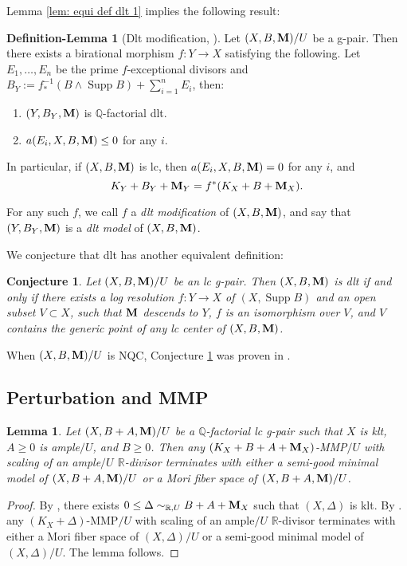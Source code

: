 \documentclass[11pt]{amsart}
\numberwithin{equation}{section}
\newcommand{\Mm}{{\bf{M}}}
\newcommand{\Qq}{\mathbb{Q}}
\newcommand{\Rr}{\mathbb{R}}
\newcommand{\Supp}{\operatorname{Supp}}
\newtheorem{conj}[thm]{Conjecture}
\newtheorem{lem}[thm]{Lemma}
\theoremstyle{definition}
\theoremstyle{definition}
\newtheorem{deflem}[thm]{Definition-Lemma}
\theoremstyle{definition}
\begin{document}
Lemma \ref{lem: equi def dlt 1} implies the following result:

\begin{deflem}[Dlt modification, {\cite[Theorem 2.9]{FS23}}]\label{deflem: dlt model}
    Let $(X,B,\Mm)/U$ be a g-pair. Then there exists a birational morphism $f: Y\rightarrow X$ satisfying the following. Let $E_1,\dots,E_n$ be the prime $f$-exceptional divisors and $B_Y:=f^{-1}_*(B\wedge\Supp B)+\sum_{i=1}^nE_i$, then:
    \begin{enumerate}
        \item $(Y,B_Y,\Mm)$ is $\Qq$-factorial dlt.
        \item $a(E_i,X,B,\Mm)\leq 0$ for any $i$.
    \end{enumerate}
    In particular, if $(X,B,\Mm)$ is lc, then $a(E_i,X,B,\Mm)=0$ for any $i$, and $$K_Y+B_Y+\Mm_Y=f^*(K_X+B+\Mm_X).$$
    
    For any such $f$, we call $f$ a \emph{dlt modification} of $(X,B,\Mm)$, and say that $(Y,B_Y,\Mm)$ is a \emph{dlt model} of $(X,B,\Mm)$. 
\end{deflem}

We conjecture that dlt has another equivalent definition:

\begin{conj}\label{conj: dlt has good resolution}
   Let $(X,B,\Mm)/U$ be an lc g-pair. Then $(X,B,\Mm)$ is dlt if and only if there exists a log resolution  $f: Y\rightarrow X$ of $(X,\Supp B)$ and an open subset $V\subset X$, such that $\Mm$ descends to $Y$, $f$ is an isomorphism over $V$, and $V$ contains the generic point of any lc center of $(X,B,\Mm)$. 
\end{conj}
When $(X,B,\Mm)/U$ is NQC, Conjecture \ref{conj: dlt has good resolution} was proven in \cite[Theorem 6.1]{Has22}.





\subsection{Perturbation and MMP}

\begin{lem}\label{lem: gklt+ample terminate}
    Let $(X,B+A,\Mm)/U$ be a $\Qq$-factorial lc g-pair such that $X$ is klt, $A\geq 0$ is ample$/U$, and $B\geq 0$. Then any $(K_X+B+A+\Mm_X)$-MMP$/U$ with scaling of an ample$/U$ $\Rr$-divisor terminates with either a semi-good minimal model of $(X,B+A,\Mm)/U$ or a Mori fiber space of  $(X,B+A,\Mm)/U$.
\end{lem}
\begin{proof}
   By \cite[Lemma 3.4]{HL22}, there exists $0\leq\Delta\sim_{\mathbb R,U}B+A+\Mm_X$ such that $(X,\Delta)$ is klt. By \cite[Corollary 1.4.2]{BCHM10}. any $(K_X+\Delta)$-MMP$/U$ with scaling of an ample$/U$ $\Rr$-divisor terminates with either a Mori fiber space of $(X,\Delta)/U$ or a semi-good minimal model of $(X,\Delta)/U$. The lemma follows. 
\end{proof}
\end{document}
